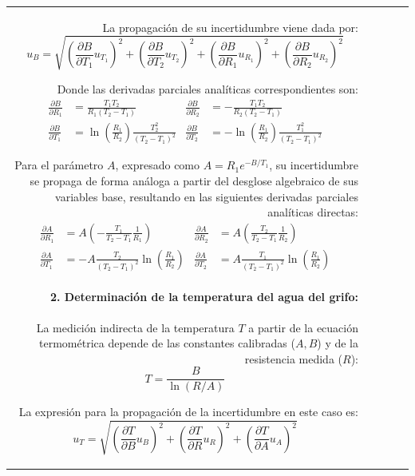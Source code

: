 \documentclass[11pt,a4paper]{article}
\begin{document}
\begin{itemize}
\begin{table}[ht!]
\begin{tabular}{r r r r r}
La propagación de su incertidumbre viene dada por:
\begin{equation}
u_B = \sqrt{\left(\frac{\partial B}{\partial T_1} u_{T_1}\right)^2 + \left(\frac{\partial B}{\partial T_2} u_{T_2}\right)^2 + \left(\frac{\partial B}{\partial R_1} u_{R_1}\right)^2 + \left(\frac{\partial B}{\partial R_2} u_{R_2}\right)^2}
\end{equation}

Donde las derivadas parciales analíticas correspondientes son:
\begin{align}
\frac{\partial B}{\partial R_1} &= \frac{T_1 T_2}{R_1(T_2 - T_1)} & \frac{\partial B}{\partial R_2} &= -\frac{T_1 T_2}{R_2(T_2 - T_1)} \\
\frac{\partial B}{\partial T_1} &= \ln\left(\frac{R_1}{R_2}\right) \frac{T_2^2}{(T_2 - T_1)^2} & \frac{\partial B}{\partial T_2} &= -\ln\left(\frac{R_1}{R_2}\right) \frac{T_1^2}{(T_2 - T_1)^2}
\end{align}

Para el parámetro $A$, expresado como $A = R_1 e^{-B/T_1}$, su incertidumbre se propaga de forma análoga a partir del desglose algebraico de sus variables base, resultando en las siguientes derivadas parciales analíticas directas:
\begin{align}
\frac{\partial A}{\partial R_1} &= A \left( -\frac{T_1}{T_2 - T_1} \frac{1}{R_1} \right) & \frac{\partial A}{\partial R_2} &= A \left( \frac{T_2}{T_2 - T_1} \frac{1}{R_2} \right) \\
\frac{\partial A}{\partial T_1} &= -A \frac{T_2}{(T_2 - T_1)^2} \ln\left(\frac{R_1}{R_2}\right) & \frac{\partial A}{\partial T_2} &= A \frac{T_1}{(T_2 - T_1)^2} \ln\left(\frac{R_1}{R_2}\right)
\end{align}

\paragraph{2. Determinación de la temperatura del agua del grifo:}
La medición indirecta de la temperatura $T$ a partir de la ecuación termométrica depende de las constantes calibradas ($A, B$) y de la resistencia medida ($R$):
\begin{equation}
T = \frac{B}{\ln(R/A)}
\end{equation}

La expresión para la propagación de la incertidumbre en este caso es:
\begin{equation}
u_T = \sqrt{\left(\frac{\partial T}{\partial B} u_B\right)^2 + \left(\frac{\partial T}{\partial R} u_R\right)^2 + \left(\frac{\partial T}{\partial A} u_A\right)^2}
\end{equation}


\end{tabular}
\end{table}
\end{itemize}
\end{document}

